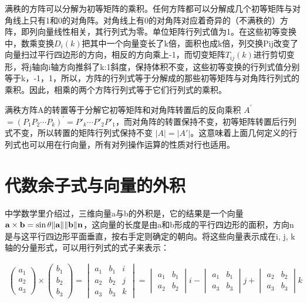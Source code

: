 	满秩的方阵可以分解为初等矩阵的乘积。任何方阵都可以分解成几个初等矩阵与对角线上只有1和0的对角阵。对角线上有0的对角阵对应着奇异的（不满秩的）方阵，即列向量线性相关，其行列式为零。单位矩阵行列式值为1。在这些初等变换中，数乘变换$ D_i(k) $把其中一个向量变长了k倍，面积也成k倍，列交换Pij改变了向量扫过平行四边形的方向，相反的方向乘上-1，而切变矩阵$ T_{ij}(k) $进行剪切变形，将j轴向i轴方向推斜了k:1斜度，保持体积不变，这些初等变换的行列式值分别等于k，-1，1，所以，方阵的行列式等于分解成的那些初等矩阵与对角阵行列式的乘积。因此，相乘的两个方阵行列式等于它们行列式的乘积。
	
	满秩方阵A的转置等于分解它初等矩阵和对角阵转置后的反向乘积 $ A^{'} $  $= (P_1 P_2\cdots P_k)^{'} = P'_k\cdots P'_2 P'_1 $，而对角阵的转置保持不变，初等矩阵转置后行列式不变，所以转置的矩阵行列式保持不变
	$ \left| A \right| = \left| {A'} \right| $。这意味着上面几何定义的行列式也可以用在行向量，所有对列操作运算的性质对行也适用。
	
	
	
	\section{代数余子式与向量的外积}
	
	中学数学里介绍过，三维向量a与b的外积是，它的结果是一个向量$ \textbf a \times \textbf b = \sin \theta \|\textbf a\|\|\textbf b \| \textbf n $，这向量的长度是由a和b形成的平行四边形的面积，方向n是与这平行四边形平面垂直，按右手定则确定的朝向。将这些向量表示成在i, j, k轴的分量形式，可以用行列式的式子来表示：
	
	\begin{gather*}
		\begin{pmatrix}a_1\\a_2\\a_3 \end{pmatrix} \times \begin{pmatrix}b_1\\b_2\\b_3 \end{pmatrix}= \begin{vmatrix}a_1&b_1&i \\a_2& b_2&j\\a_3&b_3&k \end{vmatrix} = \begin{vmatrix}a_1&b_1 \\a_2& b_2 \end{vmatrix}i - \begin{vmatrix}a_1&b_1 \\a_3&b_3 \end{vmatrix}j + \begin{vmatrix}a_2& b_2\\a_3&b_3 \end{vmatrix}k
	\end{gather*}

